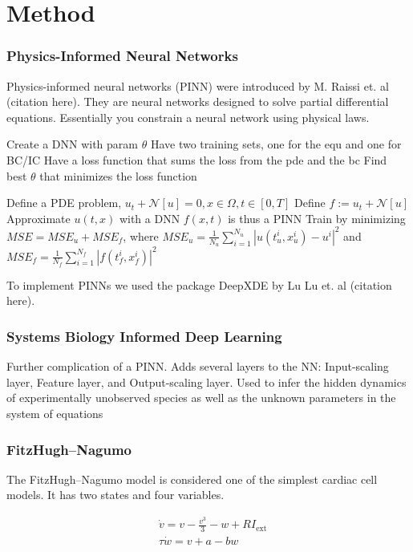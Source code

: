 \chapter{Method}
\label{sec:method}

\subsection{Physics-Informed Neural Networks}

Physics-informed neural networks (PINN) were introduced by M. Raissi et. al (citation here). 
They are neural networks designed to solve partial differential equations. 
Essentially you constrain a neural network using physical laws.

Create a DNN with param $\theta$
Have two training sets, one for the equ and one for BC/IC
Have a loss function that sums the loss from the pde and the bc
Find best $\theta$ that minimizes the loss function

Define a PDE problem, $u_{t}+\mathcal{N}[u]=0, x \in \Omega, t \in[0, T]$
Define $f:=u_{t}+\mathcal{N}[u]$
Approximate $u(t,x)$ with a DNN
$f(x,t)$ is thus a PINN 
Train by minimizing $M S E=M S E_{u}+M S E_{f}$, where $M S E_{u}=\frac{1}{N_{u}} \sum_{i=1}^{N_{u}}\left|u\left(t_{u}^{i}, x_{u}^{i}\right)-u^{i}\right|^{2}$ and $M S E_{f}=\frac{1}{N_{f}} \sum_{i=1}^{N_{f}}\left|f\left(t_{f}^{i}, x_{f}^{i}\right)\right|^{2}$

To implement PINNs we used the package DeepXDE by Lu Lu et. al (citation here). 


\subsection{Systems Biology Informed Deep Learning}

Further complication of a PINN. 
Adds several layers to the NN: Input-scaling layer, Feature layer, and Output-scaling layer.
Used to infer the hidden dynamics of experimentally unobserved species as well as the unknown parameters in the system of equations


\subsection{FitzHugh–Nagumo}

The FitzHugh–Nagumo model is considered one of the simplest cardiac cell models. It has two states and four variables.

\begin{align}\label{eq:fhn}
    &\dot{v}=v-\frac{v^{3}}{3}-w+R I_{\mathrm{ext}} \\
    &\tau \dot{w}=v+a-b w
\end{align}



